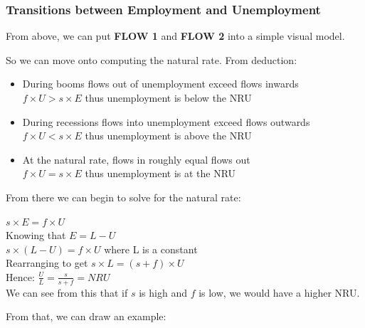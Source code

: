 \documentclass[12pt, letterpaper]{article}
\begin{document}
\subsubsection{Transitions between Employment and Unemployment}
From above, we can put \textbf{FLOW 1} and \textbf{FLOW 2} into a simple visual model.
\begin{center}
\end{center}
So we can move onto computing the natural rate. From deduction:
\begin{itemize}
	\item During booms flows out of unemployment exceed flows inwards\\
	$f\times U > s\times E$ thus unemployment is below the NRU
	\item During recessions flows into unemployment exceed flows outwards\\
	$f\times U < s\times E$ thus unemployment is above the NRU
	\item At the natural rate, flows in roughly equal flows out\\
	$f\times U = s\times E$ thus unemployment is at the NRU
\end{itemize}
From there we can begin to solve for the natural rate:
\begin{center}
	$s\times E = f\times U$\\
	Knowing that $E = L-U$\\
	$s\times (L-U) = f\times U$ where L is a constant\\
	Rearranging to get $s\times L = (s+f) \times U$\\
	Hence: $\frac{U}{L} = \frac{s}{s+f} = NRU$\\
	We can see from this that if $s$ is high and $f$ is low, we would have a higher NRU.
\end{center}
From that, we can draw an example:
\begin{center}
	\noindent{}
\end{center}
\end{document}
